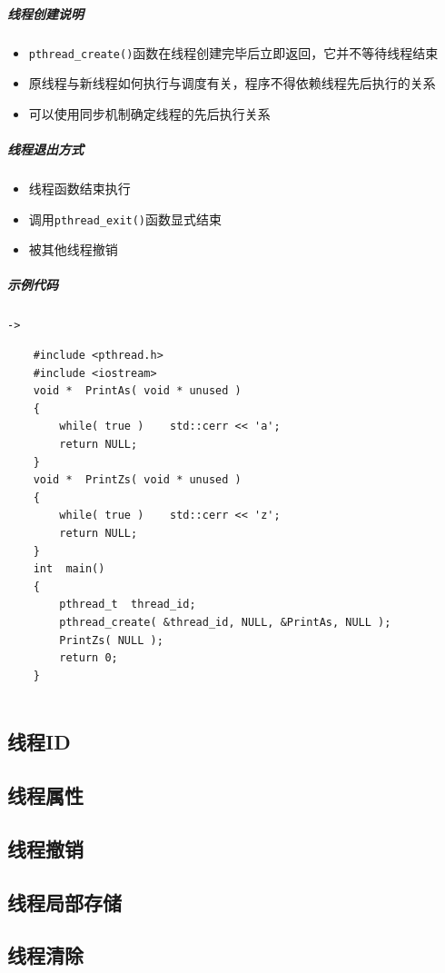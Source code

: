 \documentclass[UTF8,a4paper,12pt]{ctexbook}
\begin{document}
		\subparagraph{线程创建说明}
			\begin{itemize}[itemindent = 1em]
				\item \verb|pthread_create()|函数在线程创建完毕后立即返回，它并不等待线程结束
				\item 原线程与新线程如何执行与调度有关，程序不得依赖线程先后执行的关系
				\item 可以使用同步机制确定线程的先后执行关系
			\end{itemize}
			
		\subparagraph{线程退出方式}
			\begin{itemize}[itemindent = 1em]
				\item 线程函数结束执行
				\item 调用\verb|pthread_exit()|函数显式结束
				\item 被其他线程撤销
			\end{itemize}
			
		\subparagraph{示例代码}\verb|->|
		
			\begin{lstlisting}
	#include <pthread.h> 
	#include <iostream>
	void *  PrintAs( void * unused )
	{
		while( true )    std::cerr << 'a';
		return NULL;
	}
	void *  PrintZs( void * unused )
	{
		while( true )    std::cerr << 'z';
		return NULL;
	}
	int  main()
	{
		pthread_t  thread_id;
		pthread_create( &thread_id, NULL, &PrintAs, NULL );
		PrintZs( NULL );
		return 0;
	}
	
			\end{lstlisting}
		
	\subsection{线程ID}
	
	\subsection{线程属性}
	
	\subsection{线程撤销}

	\subsection{线程局部存储}
	
	\subsection{线程清除}
			
\end{document}
